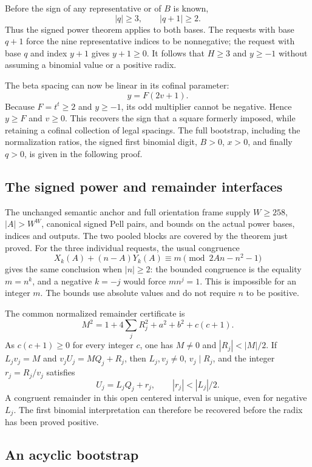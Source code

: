 \documentclass[11pt]{article}
\theoremstyle{remark}\newtheorem{remark}[theorem]{Remark}
\begin{document}
Before the sign of any representative or of $B$ is known,
\[
 |q|\ge3,\qquad |q+1|\ge2.
\]
Thus the signed power theorem applies to both bases. The requests with
base $q+1$ force the nine representative indices to be nonnegative;
the request with base $q$ and index $y+1$ gives $y+1\ge0$.
It follows that $H\ge3$ and $y\ge-1$ without assuming a binomial value
or a positive radix.

The beta spacing can now be linear in its cofinal parameter:
\begin{equation}\label{eq:beta}
 y=F(2v+1).
\end{equation}
Because $F=t^t\ge2$ and $y\ge-1$, its odd multiplier cannot be negative.
Hence $y\ge F$ and $v\ge0$. This recovers the sign that a square formerly
imposed, while retaining a cofinal collection of legal spacings. The full
bootstrap, including the normalization ratios, the signed first binomial
digit, $B>0$, $x>0$, and finally $q>0$, is given in the following proof.

\subsection{The signed power and remainder interfaces}

The unchanged semantic anchor and full orientation frame supply
$W\ge258$, $|A|>W^W$, canonical signed Pell pairs, and bounds on the
actual power bases, indices and outputs. The two pooled blocks are
covered by the theorem just proved. For the three individual requests,
the usual congruence
\[
 X_k(A)+(n-A)Y_k(A)\equiv m\pmod{2An-n^2-1}
\]
gives the same conclusion when $|n|\ge2$: the bounded congruence
is the equality $m=n^k$, and a negative $k=-j$ would force
$mn^j=1$. This is impossible for an integer $m$. The bounds use
absolute values and do not require $n$ to be positive.

The common normalized remainder certificate is
\[
 M^2=1+4\sum_j R_j^2+a^2+b^2+c(c+1).
\]
As $c(c+1)\ge0$ for every integer $c$, one has $M\ne0$ and
$|R_j|<|M|/2$. If $L_jv_j=M$ and $v_jU_j=MQ_j+R_j$, then
$L_j,v_j\ne0$, $v_j\mid R_j$, and the integer $r_j=R_j/v_j$ satisfies
\[
 U_j=L_jQ_j+r_j,\qquad |r_j|<|L_j|/2.
\]
A congruent remainder in this open centered interval is unique, even
for negative $L_j$. The first binomial interpretation can therefore be
recovered before the radix has been proved positive.

\subsection{An acyclic bootstrap}
\end{document}
